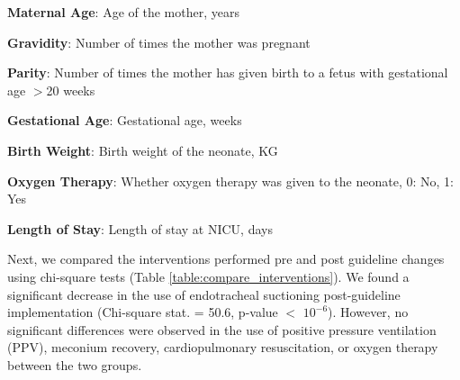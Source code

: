 \documentclass[11pt]{article}
\begin{document}
\begin{table}[h]
\caption{Descriptive Statistics of Selected Variables}
\label{table:desc_stats}
\begin{threeparttable}
\renewcommand{\TPTminimum}{\linewidth}
\begin{tablenotes}
\footnotesize
\item \textbf{Maternal Age}: Age of the mother, years
\item \textbf{Gravidity}: Number of times the mother was pregnant
\item \textbf{Parity}: Number of times the mother has given birth to a fetus with gestational age $>$20 weeks
\item \textbf{Gestational Age}: Gestational age, weeks
\item \textbf{Birth Weight}: Birth weight of the neonate, KG
\item \textbf{Oxygen Therapy}: Whether oxygen therapy was given to the neonate, 0: No, 1: Yes
\item \textbf{Length of Stay}: Length of stay at NICU, days
\end{tablenotes}
\end{threeparttable}
\end{table}


Next, we compared the interventions performed pre and post guideline changes using chi-square tests (Table {}\ref{table:compare_interventions}). We found a significant decrease in the use of endotracheal suctioning post-guideline implementation (Chi-square stat. = 50.6, p-value $<$ $10^{-6}$). However, no significant differences were observed in the use of positive pressure ventilation (PPV), meconium recovery, cardiopulmonary resuscitation, or oxygen therapy between the two groups. 
\end{document}
